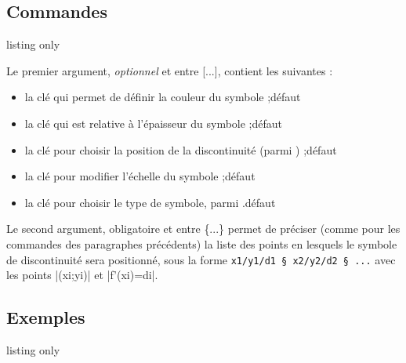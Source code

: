 \subsection{Commandes}

\begin{PresCodeTexPL}{listing only}
\end{PresCodeTexPL}

\begin{cautionblock}
Le premier argument, \textit{optionnel} et entre \textsf{[...]}, contient les  suivantes :

\begin{itemize}
	\item la clé  qui permet de définir la couleur du symbole ;\hfill{}défaut 
	\item la clé  qui est relative à l'épaisseur du symbole ;\hfill{}défaut \Cle{1.25pt}
	\item la clé  pour choisir la position de la discontinuité (parmi ) ;\hfill{}défaut 
	\item la clé  pour modifier l'échelle du symbole ;\hfill{}défaut 
	\item la clé  pour choisir le type de symbole, parmi .\hfill{}défaut 
\end{itemize}

Le second argument, obligatoire et entre \textsf{\{...\}} permet de préciser (comme pour les commandes des paragraphes précédents) la liste des points en lesquels le symbole de discontinuité sera positionné, sous la forme \verb|x1/y1/d1 § x2/y2/d2 § ...| avec les points \pverb|(xi;yi)| et \vverb|f'(xi)=di|.
\end{cautionblock}

\subsection{Exemples}

\begin{PresCodeTexPL}{listing only}
\end{PresCodeTexPL}

